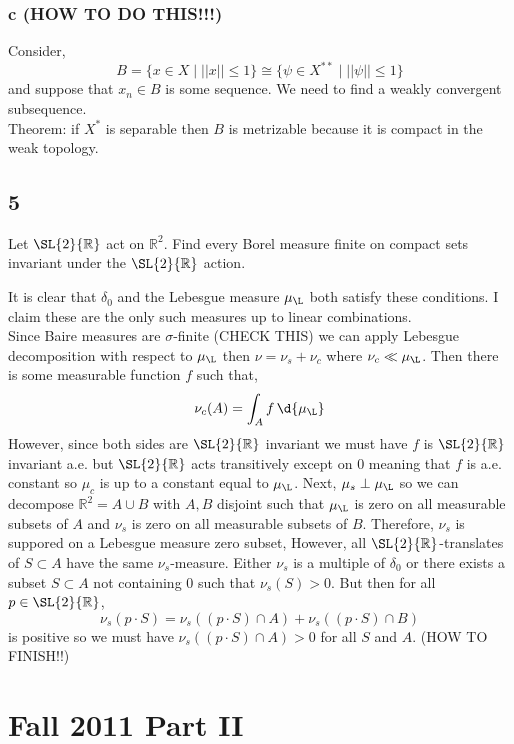 \documentclass[12pt]{article}
\newcommand{\R}{\mathbb{R}}
\begin{document}
\subsubsection{c (HOW TO DO THIS!!!)}

Consider,
\[ B = \{ x \in X \mid || x || \le 1 \} \cong \{ \psi \in X^{**} \mid || \psi || \le 1 \} \]
and suppose that $x_n \in B$ is some sequence. We need to find a weakly convergent subsequence.
\bigskip\\
Theorem: if $X^*$ is separable then $B$ is metrizable because it is compact in the weak topology.


\subsection{5}


\begin{exercise}
Let $\SL{2}{\R}$ act on $\R^2$. Find every Borel measure finite on compact sets invariant under the $\SL{2}{\R}$ action.
\end{exercise}

It is clear that $\delta_0$ and the Lebesgue measure $\mu_{\L}$ both satisfy these conditions. I claim these are the only such measures up to linear combinations.
\bigskip\\
Since Baire measures are $\sigma$-finite (CHECK THIS) we can apply Lebesgue decomposition with respect to $\mu_{\L}$ then $\nu = \nu_s + \nu_c$ where $\nu_c \ll \mu_{\L}$. Then there is some measurable function $f$ such that,
\[ \nu_c(A) = \int_A f \, \d{\mu_{\L}} \]
However, since both sides are $\SL{2}{\R}$ invariant we must have $f$ is $\SL{2}{\R}$ invariant a.e. but $\SL{2}{\R}$ acts transitively except on $0$ meaning that $f$ is a.e. constant so $\mu_c$ is up to a constant equal to $\mu_{\L}$. Next, $\mu_s \perp \mu_{\L}$ so we can decompose $\R^2 = A \cup B$ with $A, B$ disjoint such that $\mu_{\L}$ is zero on all measurable subsets of $A$ and $\nu_s$ is zero on all measurable subsets of $B$. Therefore, $\nu_s$ is suppored on a Lebesgue measure zero subset, However, all $\SL{2}{\R}$-translates of $S \subset A$ have the same $\nu_s$-measure. Either $\nu_s$ is a multiple of $\delta_0$ or there exists a subset $S \subset A$ not containing $0$ such that $\nu_s(S) > 0$. But then for all $p \in \SL{2}{\R}$,
\[ \nu_s(p \cdot S) = \nu_s((p \cdot S) \cap A) + \nu_s((p \cdot S) \cap B) \]
is positive so we must have $\nu_s((p \cdot S) \cap A) > 0$ for all $S$ and $A$. 
(HOW TO FINISH!!)


\section{Fall 2011 Part II}
\end{document}
